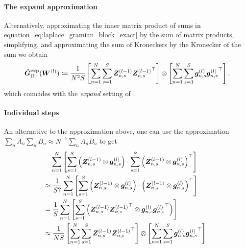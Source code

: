 \paragraph{The expand approximation}
Alternatively, approximating the inner matrix product of sums in equation~\eqref{eq:laplace_gramian_block_exact} by the sum of matrix products, simplifying, and approximating the sum of Kroneckers by the Kronecker of the sum we obtain
\begin{align*}
    \hat{{\bm{G}}}_\Omega^{\textup{exp}}({\bm{W}}^{(l)})
    \coloneqq \frac{1}{N^2 S}
    \left[\sum_{n=1}^N \sum_{s=1}^S {\bm{Z}}^{(l-1)}_{n,s}{{\bm{Z}}^{(l-1)}_{n,s}}^\top \right]
    \otimes
    \left[\sum_{n=1}^N\sum_{s=1}^S {\bm{g}}^{(l)}_{n,s}{{\bm{g}}^{(l)}_{n,s}}^\top   \right].
\end{align*}
which coincides with the \emph{expand} setting of \cite{eschenhagen2023kroneckerfactored}. 

\paragraph{Individual steps} 
An alternative to the approximation above, one can use the approximation $\sum_{n}A_n\sum_n B_n \approx N^{-1}\sum_{n}A_nB_n$ to get 
\begin{align*}
    & \sum_{n=1}^N
    \left[\sum_{s=1}^S \left( {\bm{Z}}^{(l-1)}_{n,s}\otimes {\bm{g}}_{n,s}^{(l)} \right)
    \cdot
    \sum_{s=1}^S \left( {\bm{Z}}
    ^{(l-1)}_{n,s}\otimes {\bm{g}}_{n,s}^{(l)} \right)^\top\right]
    \\ \approx & \;
    \frac{1}{S?}\sum_{n=1}^N
    \left[\sum_{s=1}^S \left( {\bm{Z}}^{(l-1)}_{n,s}\otimes {\bm{g}}_{n,s}^{(l)} \right)
    \cdot
    \left( {\bm{Z}}
    ^{(l-1)}_{n,s}\otimes {\bm{g}}_{n,s}^{(l)} \right)^\top\right]
    \\ = & \;
    \frac{1}{S}\sum_{n=1}^N
    \left[\sum_{s=1}^S \left( {\bm{Z}}^{(l-1)}_{n,s}{{\bm{Z}}
    ^{(l-1)}_{n,s}}^\top\otimes {\bm{g}}_{n,s}^{(l)}{{\bm{g}}_{n,s}^{(l)}}^\top \right)
    \right]
    \\ \approx & \;
    \frac{1}{NS}\left[\sum_{n=1}^N \sum_{s=1}^S {\bm{Z}}^{(l-1)}_{n,s}{{\bm{Z}}^{(l-1)}_{n,s}}^\top \right]
    \otimes
    \left[\sum_{n=1}^N\sum_{s=1}^S {\bm{g}}^{(l)}_{n,s}{{\bm{g}}^{(l)}_{n,s}}^\top \right].
\end{align*}

